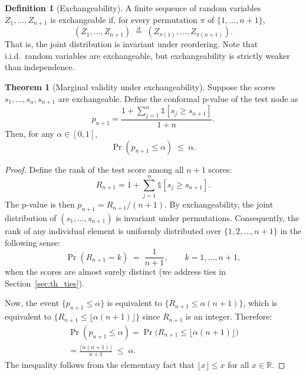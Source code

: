 \documentclass[a4paper]{cas-dc}
\theoremstyle{definition}
\newtheorem{definition}{Definition}
\newtheorem{theorem}{Theorem}
\begin{document}
\begin{definition}[Exchangeability]
\label{def:exchangeable}
A finite sequence of random variables $Z_1, \ldots, Z_{n+1}$ is {exchangeable} if, for every permutation $\pi$ of $\{1, \ldots, n+1\}$,
\begin{equation}
\label{eq:exchangeable}
    (Z_1, \ldots, Z_{n+1}) \;\overset{d}{=}\; (Z_{\pi(1)}, \ldots, Z_{\pi(n+1)}).
\end{equation}
That is, the joint distribution is invariant under reordering.  Note that i.i.d.\ random variables are exchangeable, but exchangeability is strictly weaker than independence.
\end{definition}

\begin{theorem}[Marginal validity under exchangeability]
\label{thm:marginal_full}
Suppose the scores $s_1, \ldots, s_n, s_{n+1}$ are exchangeable.  Define the conformal p-value of the test node as
\begin{equation}
\label{eq:pval_thm}
    p_{n+1} = \frac{1 + \sum_{j=1}^{n}\mathbb{1}[s_j \geq s_{n+1}]}{1 + n}.
\end{equation}
Then, for any $\alpha \in [0, 1]$,
\begin{equation}
\label{eq:validity_thm}
    \Pr(p_{n+1} \leq \alpha) \;\leq\; \alpha.
\end{equation}
\end{theorem}

\begin{proof}
Define the {rank} of the test score among all $n + 1$ scores:
\begin{equation}
\label{eq:rank}
    R_{n+1} = 1 + \sum_{j=1}^{n}\mathbb{1}[s_j \geq s_{n+1}].
\end{equation}
The p-value is then $p_{n+1} = R_{n+1}/(n + 1)$.  By exchangeability, the joint distribution of $(s_1, \ldots, s_{n+1})$ is invariant under permutations.  Consequently, the rank of any individual element is uniformly distributed over $\{1, 2, \ldots, n+1\}$ in the following sense:
\begin{equation}
\label{eq:uniform_rank}
    \Pr(R_{n+1} = k) \;=\; \frac{1}{n+1}, \qquad k = 1, \ldots, n+1,
\end{equation}
when the scores are almost surely distinct (we address ties in Section~\ref{sec:th_ties}).

Now, the event $\{p_{n+1} \leq \alpha\}$ is equivalent to $\{R_{n+1} \leq \alpha(n+1)\}$, which is equivalent to $\{R_{n+1} \leq \lfloor \alpha(n+1) \rfloor\}$ since $R_{n+1}$ is an integer.  Therefore:
\begin{multline}
\label{eq:prob_bound}
    \Pr(p_{n+1} \leq \alpha)
    = \Pr\bigl(R_{n+1} \leq \lfloor\alpha(n+1)\rfloor\bigr)\\
    = \frac{\lfloor\alpha(n+1)\rfloor}{n+1} \;\leq\; \alpha.
\end{multline}
The inequality follows from the elementary fact that $\lfloor x \rfloor \leq x$ for all $x \in \mathbb{R}$.
\end{proof}
\end{document}

